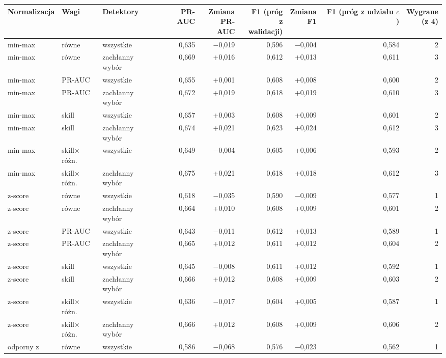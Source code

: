 \begin{tabular}{lllrrrrrr}
\toprule
Normalizacja & Wagi & Detektory & PR-AUC & \makecell[r]{Zmiana\\PR-AUC} & \makecell[r]{F1 (próg\\z walidacji)} & \makecell[r]{Zmiana\\F1} & \makecell[r]{F1 (próg\\z udziału $c$)} & \makecell[r]{Wygrane\\(z 4)} \\
\midrule
min-max & równe & wszystkie & 0,635 & $-$0,019 & 0,596 & $-$0,004 & 0,584 & 2 \\
min-max & równe & zachłanny wybór & 0,669 & +0,016 & 0,612 & +0,013 & 0,611 & 3 \\
min-max & PR-AUC & wszystkie & 0,655 & +0,001 & 0,608 & +0,008 & 0,600 & 2 \\
min-max & PR-AUC & zachłanny wybór & 0,672 & +0,019 & 0,618 & +0,019 & 0,610 & 3 \\
min-max & skill & wszystkie & 0,657 & +0,003 & 0,608 & +0,009 & 0,601 & 2 \\
min-max & skill & zachłanny wybór & 0,674 & +0,021 & 0,623 & +0,024 & 0,612 & 3 \\
min-max & skill$\times$różn. & wszystkie & 0,649 & $-$0,004 & 0,605 & +0,006 & 0,593 & 2 \\
min-max & skill$\times$różn. & zachłanny wybór & 0,675 & +0,021 & 0,618 & +0,018 & 0,612 & 3 \\
z-score & równe & wszystkie & 0,618 & $-$0,035 & 0,590 & $-$0,009 & 0,577 & 1 \\
z-score & równe & zachłanny wybór & 0,664 & +0,010 & 0,608 & +0,009 & 0,601 & 2 \\
z-score & PR-AUC & wszystkie & 0,643 & $-$0,011 & 0,612 & +0,013 & 0,589 & 1 \\
z-score & PR-AUC & zachłanny wybór & 0,665 & +0,012 & 0,611 & +0,012 & 0,604 & 2 \\
z-score & skill & wszystkie & 0,645 & $-$0,008 & 0,611 & +0,012 & 0,592 & 1 \\
z-score & skill & zachłanny wybór & 0,666 & +0,012 & 0,608 & +0,009 & 0,603 & 2 \\
z-score & skill$\times$różn. & wszystkie & 0,636 & $-$0,017 & 0,604 & +0,005 & 0,587 & 1 \\
z-score & skill$\times$różn. & zachłanny wybór & 0,666 & +0,012 & 0,608 & +0,009 & 0,606 & 2 \\
odporny z & równe & wszystkie & 0,586 & $-$0,068 & 0,576 & $-$0,023 & 0,562 & 1 \\

\end{tabular}
